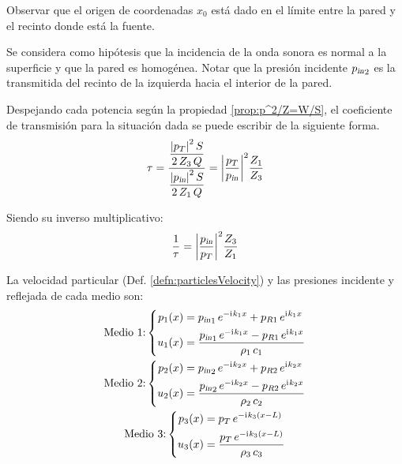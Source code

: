 \documentclass[a5paper,12pt,twoside]{book}
\begin{document}
\begin{center}
    \def\svgwidth{0.7\linewidth}
    
\end{center}

Observar que el origen de coordenadas $x_0$ está dado en el límite entre la pared y el recinto donde está la fuente.

Se considera como hipótesis que la incidencia de la onda sonora es normal a la superficie y que la pared es homogénea.
Notar que la presión incidente ${{p}_\textsl{{in}}}_2$ es la transmitida del recinto de la izquierda hacia el interior de la pared.

Despejando cada potencia según la propiedad \ref{prop:p^2/Z=W/S}, el coeficiente de transmisión para la situación dada se puede escribir de la siguiente forma.
\begin{equation*}
    \tau = \frac{\dfrac{{\left| {p_T} \right|}^2 \, S}{2\,Z_3\,Q}}{\dfrac{{\left| {{{p}_\textsl{{in}}}} \right|}^2 \, S}{2\,Z_1\,Q}}
    = {\left| {\frac{p_T}{{{p}_\textsl{{in}}}}} \right|}^2 \frac{Z_1}{Z_3}
\end{equation*}

Siendo su inverso multiplicativo:
\begin{equation}
    \frac{1}{\tau} = {\left| {\frac{{{p}_\textsl{{in}}}}{p_T}} \right|}^2 \frac{Z_3}{Z_1}
    \label{eqn:mediumTau}
\end{equation}

La velocidad particular (Def. \ref{defn:particlesVelocity}) y las presiones incidente y reflejada de cada medio son:
\begin{gather*}
    \text{Medio 1:}
    \left\{
    \begin{aligned}
        p_1(x) &= {{p}_\textsl{{in}}}_1 \, e^{-\mathrm{i}\mkern1mu k_1 x} + p_{R1} \, e^{\mathrm{i}\mkern1mu k_1 x}
        \\
        u_1(x) &= \frac{{{p}_\textsl{{in}}}_1 \, e^{-\mathrm{i}\mkern1mu k_1 x} - p_{R1} \, e^{\mathrm{i}\mkern1mu k_1 x}}{\rho_1 \, c_1}
    \end{aligned}
    \right.
    \\
    \text{Medio 2:}
    \left\{
    \begin{aligned}
        p_2(x) &= {{p}_\textsl{{in}}}_2 \, e^{-\mathrm{i}\mkern1mu k_2 x} + p_{R2} \, e^{\mathrm{i}\mkern1mu k_2 x}
        \\
        u_2(x) &= \frac{{{p}_\textsl{{in}}}_2 \, e^{-\mathrm{i}\mkern1mu k_2 x} - p_{R2} \, e^{\mathrm{i}\mkern1mu k_2 x}}{\rho_2 \, c_2}
    \end{aligned}
    \right.
    \\
    \text{Medio 3:}
    \left\{
    \begin{aligned}
        p_3(x) &= p_T \, e^{-\mathrm{i}\mkern1mu k_3 \left(x-L\right)}
        \\
        u_3(x) &= \frac{p_T \, e^{-\mathrm{i}\mkern1mu k_3 \left(x-L\right)}}{\rho_3 \, c_3}
    \end{aligned}
    \right.
\end{gather*}
\end{document}
